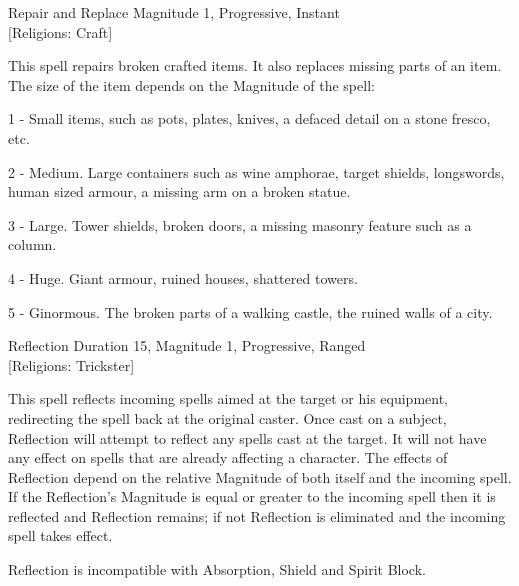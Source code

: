 \begin{rpg-spell}
{Repair and Replace}
{Magnitude 1, Progressive, Instant\\{[Religions: Craft]}}

This spell repairs broken crafted items. It also replaces missing parts of an item. The size of the item depends on the Magnitude of the spell:
\begin{rpg-list}
\item 1 - Small items, such as pots, plates, knives, a defaced detail on a stone fresco, etc.
\item 2 - Medium. Large containers such as wine amphorae, target shields, longswords, human sized armour, a missing arm on a broken statue.
\item 3 - Large. Tower shields, broken doors, a missing masonry feature such as a column.
\item 4 - Huge. Giant armour, ruined houses, shattered towers.
\item 5 - Ginormous. The broken parts of a walking castle, the ruined walls of a city.
\end{rpg-list}
\end{rpg-spell}

\begin{rpg-spell}
{Reflection}
{Duration 15, Magnitude 1, Progressive, Ranged\\{[Religions: Trickster]}}

This spell reflects incoming spells aimed at the target or his equipment, redirecting the spell back at the original caster. Once cast on a subject, Reflection will attempt to reflect any spells cast at the target. It will not have any effect on spells that are already affecting a character. The effects of Reflection depend on the relative Magnitude of both itself and the incoming spell. If the Reflection's Magnitude is equal or greater to the incoming spell then it is reflected and Reflection remains; if not Reflection is eliminated and the incoming spell takes effect. 

Reflection is incompatible with Absorption, Shield and Spirit Block.
\end{rpg-spell}

